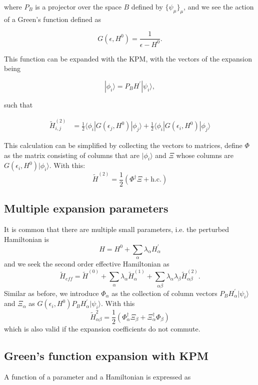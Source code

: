 \documentclass[10pt, onecolumn, aps, prb, superscriptaddress, floatfix, showpacs, notitlepage]{revtex4-1}
\newcommand{\bra}[1]{\langle #1|}
\newcommand{\ket}[1]{|#1\rangle}
\begin{document}
where $P_B$ is a projector over the space $B$ defined by $\{\psi_\mu\}_\mu$,
and we see the action of a Green's function defined as

$$
G(\epsilon, H^0) = \frac{1}{\epsilon-H^0}.
$$

This function can be expanded with the KPM, with the vectors of the expansion
being

$$
\ket{\phi_i} = P_B H^{\prime}\ket{\psi_i},
$$


such that


\begin{align}
\tilde{H}^{(2)}_{i,j} &= \frac{1}{2}
\bra{\phi_i} G(\epsilon_j, H^0) \ket{\phi_j}
+
\frac{1}{2}
\bra{\phi_i} G(\epsilon_i, H^0) \ket{\phi_j}
\end{align}

This calculation can be simplified by collecting the vectors to matrices, define $\Phi$ as the matrix consisting of columns that are $\ket{\phi_i}$ and $\Xi$ whose columns are $G(\epsilon_i, H^0) \ket{\phi_i}$. With this:
\begin{equation}
\tilde{H}^{(2)} = \frac{1}{2} (\Phi^\dag \Xi + \text{h.c.})
\end{equation}

\subsection{Multiple expansion parameters}

It is common that there are multiple small parameters, i.e. the perturbed Hamiltonian is
\[H = H^0 + \sum_{\alpha} \lambda_{\alpha} H^{\prime}_{\alpha}\]
and we seek the second order effective Hamiltonian as
\[\tilde{H}_{eff} = \tilde{H}^{(0)} +  \sum_{\alpha} \lambda_{\alpha} \tilde{H}^{(1)}_{\alpha} +  \sum_{\alpha\beta} \lambda_{\alpha}\lambda_{\beta}\tilde{H}^{(2)}_{\alpha\beta}.\]
Similar as before, we introduce $\Phi_{\alpha}$ as the collection of column vectors $P_B H^{\prime}_{\alpha}\ket{\psi_i}$ and $\Xi_{\alpha}$ as $G(\epsilon_i, H^0) P_B H^{\prime}_{\alpha}\ket{\psi_i}$. With this
\[\tilde{H}^2_{\alpha\beta} = \frac{1}{2} (\Phi_{\alpha}^\dag \Xi_{\beta} + \Xi_{\alpha}^\dag\Phi_{\beta})\]
which is also valid if the expansion coefficients do not commute.

\subsection{Green's function expansion with KPM}

A function of a parameter and a Hamiltonian is expressed as
\end{document}

